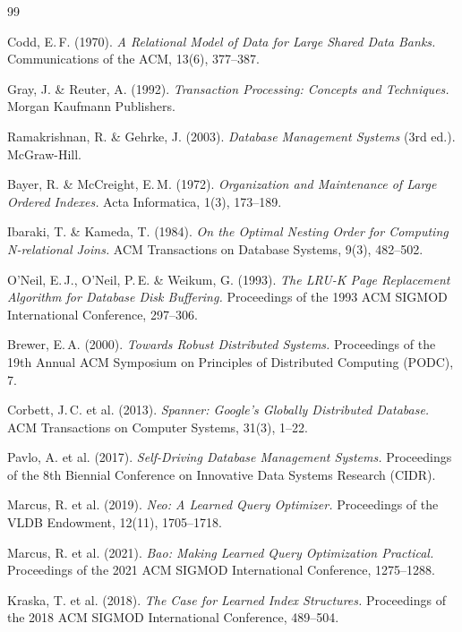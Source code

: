 ﻿\documentclass[a4paper,12pt]{article}
\theoremstyle{definition}
\begin{document}
\begin{thebibliography}{99}

Codd, E.\,F. (1970).
\textit{A Relational Model of Data for Large Shared Data Banks.}
Communications of the ACM, 13(6), 377--387.

Gray, J. \& Reuter, A. (1992).
\textit{Transaction Processing: Concepts and Techniques.}
Morgan Kaufmann Publishers.

Ramakrishnan, R. \& Gehrke, J. (2003).
\textit{Database Management Systems} (3rd ed.).
McGraw-Hill.

Bayer, R. \& McCreight, E.\,M. (1972).
\textit{Organization and Maintenance of Large Ordered Indexes.}
Acta Informatica, 1(3), 173--189.

Ibaraki, T. \& Kameda, T. (1984).
\textit{On the Optimal Nesting Order for Computing N-relational Joins.}
ACM Transactions on Database Systems, 9(3), 482--502.

O'Neil, E.\,J., O'Neil, P.\,E. \& Weikum, G. (1993).
\textit{The LRU-K Page Replacement Algorithm for Database Disk Buffering.}
Proceedings of the 1993 ACM SIGMOD International Conference, 297--306.

Brewer, E.\,A. (2000).
\textit{Towards Robust Distributed Systems.}
Proceedings of the 19th Annual ACM Symposium on Principles of Distributed Computing (PODC), 7.

Corbett, J.\,C. et al. (2013).
\textit{Spanner: Google's Globally Distributed Database.}
ACM Transactions on Computer Systems, 31(3), 1--22.

Pavlo, A. et al. (2017).
\textit{Self-Driving Database Management Systems.}
Proceedings of the 8th Biennial Conference on Innovative Data Systems Research (CIDR).

Marcus, R. et al. (2019).
\textit{Neo: A Learned Query Optimizer.}
Proceedings of the VLDB Endowment, 12(11), 1705--1718.

Marcus, R. et al. (2021).
\textit{Bao: Making Learned Query Optimization Practical.}
Proceedings of the 2021 ACM SIGMOD International Conference, 1275--1288.

Kraska, T. et al. (2018).
\textit{The Case for Learned Index Structures.}
Proceedings of the 2018 ACM SIGMOD International Conference, 489--504.


\end{thebibliography}
\end{document}
